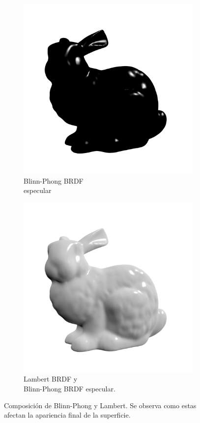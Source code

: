 \begin{figure}[H]
\begin{subfigure}[t]{0.33\textwidth}
		\includegraphics[width=\linewidth]{media/specular_bunny.png}
		\caption*{Blinn-Phong \ac{BRDF}\\ especular}
	\end{subfigure}%
	\begin{subfigure}[t]{0.33\textwidth}
		\centering
		\captionsetup{justification=centering}
		\includegraphics[width=\linewidth]{media/diffuse_specular_bunny.png}
		\caption*{Lambert \ac{BRDF} y \\Blinn-Phong \ac{BRDF} especular.}
	\end{subfigure}
	\caption{Composición de Blinn-Phong y Lambert. Se observa como estas afectan la apariencia final de la superficie.}
	\label{fig:brdfs_comparison}
\end{figure}

